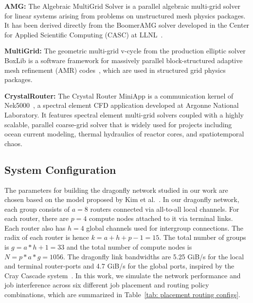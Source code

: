 \textbf{AMG:} The Algebraic MultiGrid Solver is a parallel algebraic multi-grid solver for linear systems arising from problems on unstructured mesh physics packages. It has been derived directly from the BoomerAMG solver developed in the Center for Applied Scientific Computing (CASC) at LLNL~\cite{amg}. 


\textbf{MultiGrid:} The geometric multi-grid v-cycle from the production elliptic solver BoxLib is a software framework for massively parallel block-structured adaptive mesh refinement (AMR) codes~\cite{boxlib}, which are used in structured grid physics packages. 

\textbf{CrystalRouter:} The Crystal Router MiniApp is a communication kernel of Nek5000~\cite{nek5000}, a spectral element CFD application developed at Argonne National Laboratory. It features spectral element multi-grid solvers coupled with a highly scalable, parallel coarse-grid solver that is widely used for projects including ocean current modeling, thermal hydraulics of reactor cores, and spatiotemporal chaos. 




\subsection{System Configuration}
\label{sec: simulation configuration}

The parameters for building the dragonfly network studied in our work are chosen based on the model proposed by Kim et al.~\cite{kim-micro}. 
In our dragonfly network, each group consists of $a = 8$ routers connected via all-to-all local channels. For each router, there are $p = 4$ compute nodes attached to it via terminal links. Each router also has $h = 4$ global channels used for intergroup connections. The radix of each router is hence $k = a+h+p-1 = 15$. 
The total number of groups is $g = a*h+1 = 33 $ and the total number of compute nodes is $N = p*a*g = 1056$. 
The dragonfly link bandwidths are 5.25 GiB/s for the local and terminal router-ports and 4.7 GiB/s for the global ports, inspired by the Cray Cascade system~\cite{faanes}.  
In this work, we simulate the network performance and job interference across six different job placement and routing policy combinations, which are summarized in Table~\ref{tab: placement routing configs}.


